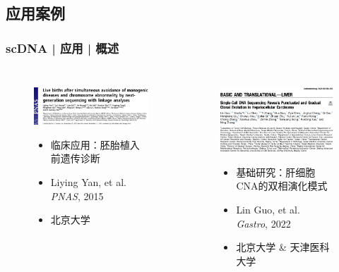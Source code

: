 \documentclass[11pt]{ctexbeamer}
\begin{document}
\subsection{应用案例}
\begin{frame}
  \frametitle{scDNA | 应用 | 概述}
  \begin{columns}
  \begin{figure}
    \centering
    \includegraphics[width=\textwidth]{scDNA_PNAS.png}\\
  \begin{itemize}
    \item 临床应用：胚胎植入前遗传诊断
    \item Liying Yan, et al. \textit{PNAS}, 2015
    \item 北京大学
  \end{itemize}
  \end{figure}
  \begin{figure}
    \centering
    \includegraphics[width=\textwidth]{scDNA_Gastro.png}\\
  \begin{itemize}
    \item 基础研究：肝细胞CNA的双相演化模式
    \item Lin Guo, et al. \textit{Gastro}, 2022
    \item 北京大学 \& 天津医科大学
  \end{itemize}
  \end{figure}
  \end{columns}
\end{frame}
\end{document}
